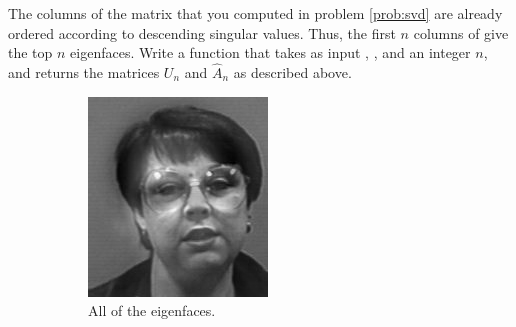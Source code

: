 \begin{problem}
\label{prob:top_n}
The columns of the matrix  that you computed in problem \ref{prob:svd} are already ordered according to descending singular values.
Thus, the first $n$ columns of  give the top $n$ eigenfaces.
Write a function  that takes as input , , and an integer $n$, and returns the matrices $U_n$ and $\hat{A}_n$ as described above.
\end{problem}
\begin{figure}
\begin{subfigure}[b]{0.3\textwidth}
\includegraphics[width=\textwidth]{rebuiltAll.png}
\caption{All of the eigenfaces.}
\end{subfigure}
\begin{subfigure}[b]{0.3\textwidth}

\end{subfigure}
\end{figure}
